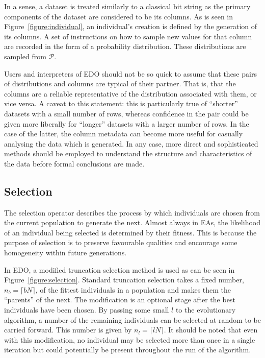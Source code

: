 
In a sense, a dataset is treated similarly to a classical bit string as the
primary components of the dataset are considered to be its columns. As is
seen in Figure~\ref{figure:individual}, an individual's creation is defined by
the generation of its columns. A set of instructions on how to sample new
values for that column are recorded in the form of a probability distribution.
These distributions are sampled from \(\mathcal{P}\).

Users and interpreters of EDO should not be so quick to assume that these pairs
of distributions and columns are typical of their partner. That is, that the
columns are a reliable representative of the distribution associated with them,
or vice versa. A caveat to this statement: this is particularly true of
``shorter'' datasets with a small number of rows, whereas confidence in the pair
could be given more liberally for ``longer'' datasets with a larger number of
rows. In the case of the latter, the column metadata can become more useful for
casually analysing the data which is generated. In any case, more direct and
sophisticated methods should be employed to understand the structure and
characteristics of the data before formal conclusions are made.



\subsection{Selection}

The selection operator describes the process by which individuals are chosen
from the current population to generate the next. Almost always in EAs, the
likelihood of an individual being selected is determined by their fitness. This
is because the purpose of selection is to preserve favourable qualities and
encourage some homogeneity within future generations.


In EDO, a modified truncation selection method is used as can be seen in
Figure~\ref{figure:selection}. Standard truncation selection takes a fixed
number, \(n_b = \lceil bN\rceil\), of the fittest individuals in a population
and makes them the ``parents'' of the next. The modification is an optional
stage after the best individuals have been chosen. By passing some small \(l\)
to the evolutionary algorithm, a number of the remaining individuals can be
selected at random to be carried forward. This number is given by \(n_l = \lceil
lN \rceil\). It should be noted that even with this modification, no individual
may be selected more than once in a single iteration but could potentially be
present throughout the run of the algorithm.

